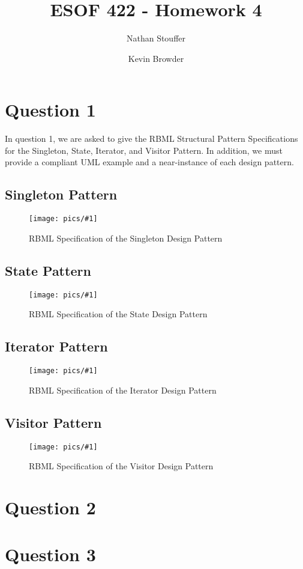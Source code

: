 \documentclass{article}
\newcommand{\fig}[3]{ 
	\begin{figure}[h]
		\centering
		\caption{#3}
		\texttt{[image: pics/\#1]}
		\label{fig:#1}
	\end{figure} 
}
\begin{document}
	
\title{ESOF 422 - Homework 4}
\author{Nathan Stouffer \and Kevin Browder}

\maketitle
\newpage

\section*{Question 1}

In question 1, we are asked to give the RBML Structural Pattern Specifications for the Singleton, State, Iterator, and Visitor Pattern. In addition, we must provide a compliant UML example and a near-instance of each design pattern.

\subsection*{Singleton Pattern}

\fig{singleton-rbml}{.4}{RBML Specification of the Singleton Design Pattern}

\subsection*{State Pattern}

\fig{state-rbml}{.95}{RBML Specification of the State Design Pattern}

\subsection*{Iterator Pattern}

\fig{iterator-rbml}{.5}{RBML Specification of the Iterator Design Pattern}

\subsection*{Visitor Pattern}

\fig{visitor-rbml}{.75}{RBML Specification of the Visitor Design Pattern}

\newpage

\section*{Question 2}

\newpage

\section*{Question 3}
\end{document}
